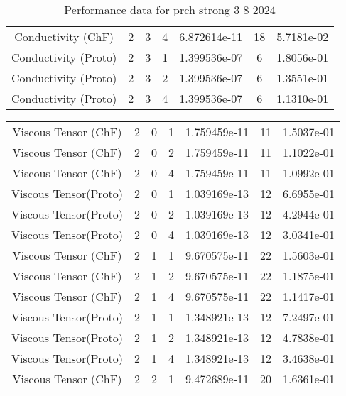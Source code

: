 \documentclass{article}
\begin{document}
\begin{small}
\begin{table}
\begin{center}
\begin{tabular}{|c|c|c|c|c|c||c|}
        Conductivity    (ChF) & 2 & 3 & 4& 6.872614e-11 & 18 & 5.7181e-02\\
        Conductivity  (Proto) & 2 & 3 & 1& 1.399536e-07 & 6 & 1.8056e-01\\
        Conductivity  (Proto) & 2 & 3 & 2& 1.399536e-07 & 6 & 1.3551e-01\\
        Conductivity  (Proto) & 2 & 3 & 4& 1.399536e-07 & 6 & 1.1310e-01\\
        \hline 
      \end{tabular} 
    \end{center}   
    \caption{Performance data for  prch strong 3 8 2024} 
  \end{table} 
\end{small}

\begin{small} 
  \begin{table} 
    \begin{center}
      \begin{tabular}{|c|c|c|c|c|c||c|} \hline 
        \hline 
        Viscous Tensor  (ChF) & 2 & 0 & 1& 1.759459e-11 & 11 & 1.5037e-01\\
        Viscous Tensor  (ChF) & 2 & 0 & 2& 1.759459e-11 & 11 & 1.1022e-01\\
        Viscous Tensor  (ChF) & 2 & 0 & 4& 1.759459e-11 & 11 & 1.0992e-01\\
        Viscous Tensor(Proto) & 2 & 0 & 1& 1.039169e-13 & 12 & 6.6955e-01\\
        Viscous Tensor(Proto) & 2 & 0 & 2& 1.039169e-13 & 12 & 4.2944e-01\\
        Viscous Tensor(Proto) & 2 & 0 & 4& 1.039169e-13 & 12 & 3.0341e-01\\
        \hline 
        Viscous Tensor  (ChF) & 2 & 1 & 1& 9.670575e-11 & 22 & 1.5603e-01\\
        Viscous Tensor  (ChF) & 2 & 1 & 2& 9.670575e-11 & 22 & 1.1875e-01\\
        Viscous Tensor  (ChF) & 2 & 1 & 4& 9.670575e-11 & 22 & 1.1417e-01\\
        Viscous Tensor(Proto) & 2 & 1 & 1& 1.348921e-13 & 12 & 7.2497e-01\\
        Viscous Tensor(Proto) & 2 & 1 & 2& 1.348921e-13 & 12 & 4.7838e-01\\
        Viscous Tensor(Proto) & 2 & 1 & 4& 1.348921e-13 & 12 & 3.4638e-01\\
        \hline 
        Viscous Tensor  (ChF) & 2 & 2 & 1& 9.472689e-11 & 20 & 1.6361e-01\\

\end{tabular}
\end{center}
\end{table}
\end{small}
\end{document}
